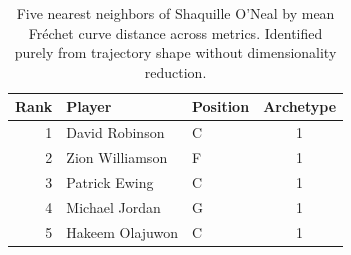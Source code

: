 \begin{table}[htbp]
  \centering\small
  \begin{tabular}{rllc}
    \toprule
    Rank & Player & Position & Archetype \\
    \midrule
    1 & David Robinson & C & 1 \\
    2 & Zion Williamson & F & 1 \\
    3 & Patrick Ewing & C & 1 \\
    4 & Michael Jordan & G & 1 \\
    5 & Hakeem Olajuwon & C & 1 \\
    \bottomrule
  \end{tabular}
  \caption{Five nearest neighbors of Shaquille O'Neal by mean Fr\'{e}chet curve distance across metrics. Identified purely from trajectory shape without dimensionality reduction.}
  \label{tab:Shaquille_O_Neal_frechet_curve_neighbors}
\end{table}


